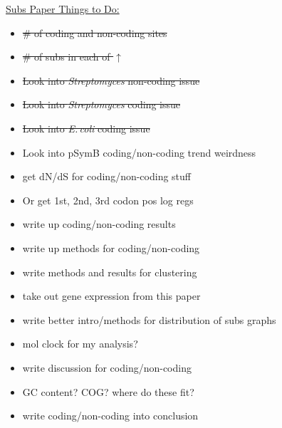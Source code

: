 \documentclass[12pt]{article}
\newcommand{\strep}{\textit{Streptomyces}\xspace}
\newcommand{\ecol}{\textit{E.\,coli}\xspace}
\newcommand{\pb}{pSymB\xspace}
\begin{document}
\underline{Subs Paper Things to Do:}
\begin{itemize}
	\item \sout{ \# of coding and non-coding sites}
	
	\item \sout{\# of subs in each of $\uparrow$}
	
	\item \sout{Look into \strep non-coding issue}
	
	\item \sout{Look into \strep coding issue}
	
	\item \sout{Look into \ecol coding issue}
	
	\item Look into \pb coding/non-coding trend weirdness
	
	\item get dN/dS for coding/non-coding stuff
	 
	\item Or get 1st, 2nd, 3rd codon pos log regs
	
	\item write up coding/non-coding results
	
	\item write up methods for coding/non-coding
	
	\item write methods and results for clustering
	
	\item take out gene expression from this paper
	
	\item write better intro/methods for distribution of subs graphs
	
	\item mol clock for my analysis?
	
	\item write discussion for coding/non-coding
	
	\item GC content? COG? where do these fit?
	
	\item write coding/non-coding into conclusion
	
\end{itemize}
\end{document}
